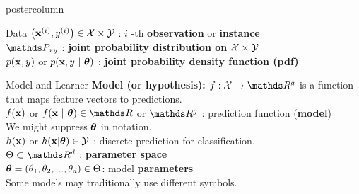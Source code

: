 \documentclass{beamer}
\begin{document}
\begin{frame}[fragile]{}
\begin{columns}
\begin{column}{.31\textwidth}
\begin{beamercolorbox}[center]{postercolumn}
\begin{minipage}{.98\textwidth}
{\begin{myblock}{Data}
            $\left(\mathbf{x}^{(i)}, y^{(i)}\right) \in \mathcal{X}\times \mathcal{Y}$ : $i$ -th \textbf{observation} or \textbf{instance} \\
             
            $\P_{xy}$ : \textbf{joint probability distribution on} $\mathcal{X} \times \mathcal{Y}$ \\
              
            $p(\mathbf{x},y)$ or $p(\mathbf{x}, y ~|~ \bm{\theta})$ : \textbf{joint probability density function (pdf)} \\
					\end{myblock}
					\begin{myblock}{Model and Learner}
            \textbf{Model (or \textbf{hypothesis}): }$f : \Xspace \rightarrow \R^g$ is a function that maps feature vectors to predictions. \\
            
            $f(\mathbf{x})$ or $\fxt \in \R$ or $\R^g$ : prediction function (\textbf{model}) \\ %
            \hspace*{1ex}We might suppress $\bm{\theta}$ in notation. \\
            
            $h(\mathbf{x})$ or $h(\mathbf{x} | \bm{\theta}) \in \mathcal{Y}$ : discrete prediction for classification. \\
            
            $\Theta \subset \R^d$ : \textbf{parameter space} \\
              
            $\bm{\theta} = (\theta_1, \theta_2, ..., \theta_d) \in \Theta$: model \textbf{parameters}\\
              \hspace*{1ex}Some models may traditionally use different symbols. \\
      

\end{myblock}}
\end{minipage}
\end{beamercolorbox}
\end{column}
\end{columns}
\end{frame}
\end{document}
